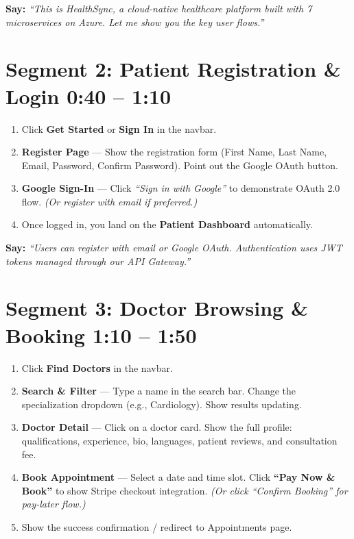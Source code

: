 \documentclass[11pt,a4paper]{article}
\begin{document}
\textbf{Say:} \textit{``This is HealthSync, a cloud-native healthcare platform built with 7 microservices on Azure. Let me show you the key user flows.''}

\section{Segment 2: Patient Registration \& Login \hfill \textcolor{timecolor}{\normalsize 0:40 -- 1:10}}

\begin{enumerate}[leftmargin=1.5em, label=\textbf{\arabic*.}]
  \item Click \textbf{Get Started} or \textbf{Sign In} in the navbar.
  \item \textbf{Register Page} --- Show the registration form (First Name, Last Name, Email, Password, Confirm Password). Point out the Google OAuth button.
  \item \textbf{Google Sign-In} --- Click \textit{``Sign in with Google''} to demonstrate OAuth 2.0 flow. \textit{(Or register with email if preferred.)}
  \item Once logged in, you land on the \textbf{Patient Dashboard} automatically.
\end{enumerate}

\textbf{Say:} \textit{``Users can register with email or Google OAuth. Authentication uses JWT tokens managed through our API Gateway.''}

\section{Segment 3: Doctor Browsing \& Booking \hfill \textcolor{timecolor}{\normalsize 1:10 -- 1:50}}

\begin{enumerate}[leftmargin=1.5em, label=\textbf{\arabic*.}]
  \item Click \textbf{Find Doctors} in the navbar.
  \item \textbf{Search \& Filter} --- Type a name in the search bar. Change the specialization dropdown (e.g., Cardiology). Show results updating.
  \item \textbf{Doctor Detail} --- Click on a doctor card. Show the full profile: qualifications, experience, bio, languages, patient reviews, and consultation fee.
  \item \textbf{Book Appointment} --- Select a date and time slot. Click \textbf{``Pay Now \& Book''} to show Stripe checkout integration. \textit{(Or click ``Confirm Booking'' for pay-later flow.)}
  \item Show the success confirmation / redirect to Appointments page.
\end{enumerate}
\end{document}
